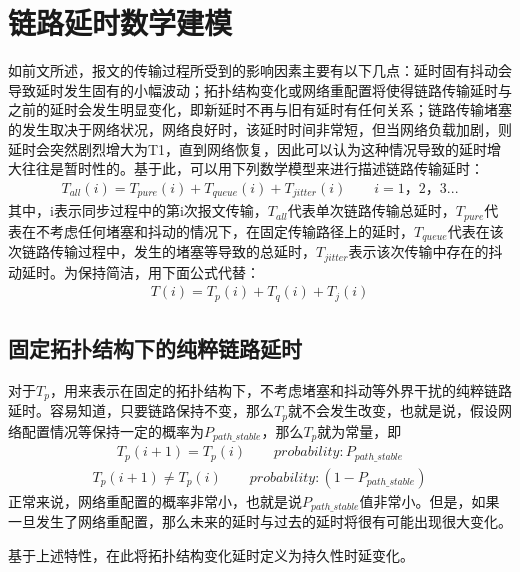 \section{链路延时数学建模}
如前文所述，报文的传输过程所受到的影响因素主要有以下几点：延时固有抖动会导致延时发生固有的小幅波动；拓扑结构变化或网络重配置将使得链路传输延时与之前的延时会发生明显变化，即新延时不再与旧有延时有任何关系；链路传输堵塞的发生取决于网络状况，网络良好时，该延时时间非常短，但当网络负载加剧，则延时会突然剧烈增大为T1，直到网络恢复，因此可以认为这种情况导致的延时增大往往是暂时性的。基于此，可以用下列数学模型\supercite{33}来进行描述链路传输延时：
\begin {align}
T_{all}(i) = T_{pure}(i) + T_{queue}(i) + T_{jitter}(i)  \qquad i=1，2，3...
\end{align}
其中，i表示同步过程中的第i次报文传输，$T_{all}$代表单次链路传输总延时，$T_{pure}$代表在不考虑任何堵塞和抖动的情况下，在固定传输路径上的延时，$T_{queue}$代表在该次链路传输过程中，发生的堵塞等导致的总延时，$T_{jitter}$表示该次传输中存在的抖动延时。为保持简洁，用下面公式代替：
\begin {align}
T(i) = T_{p}(i) + T_{q}(i) + T_{j}(i)
\end{align}

\subsection{固定拓扑结构下的纯粹链路延时}
对于$T_{p}$，用来表示在固定的拓扑结构下，不考虑堵塞和抖动等外界干扰的纯粹链路延时。容易知道，只要链路保持不变，那么$T_{p}$就不会发生改变，也就是说，假设网络配置情况等保持一定的概率为$P_{path\_stable}$，那么$T_{p}$就为常量，即
\begin {align}
T_{p}(i+1) = T_{p}(i) \qquad probability: P_{path\_stable}
\end{align}
\begin {align}
T_{p}(i+1) \neq T_{p}(i) \qquad probability: (1-P_{path\_stable})
\end{align}
正常来说，网络重配置的概率非常小，也就是说$P_{path\_stable}$值非常小。但是，如果一旦发生了网络重配置，那么未来的延时与过去的延时将很有可能出现很大变化。

基于上述特性，在此将拓扑结构变化延时定义为持久性时延变化。

